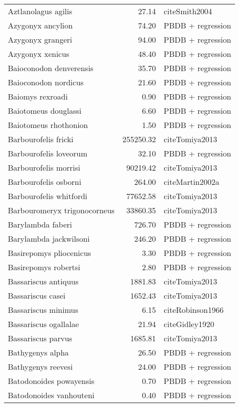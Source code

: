 \begin{table}[ht]
\begin{tabular}{lrl}
  Aztlanolagus agilis & 27.14 & cite{Smith2004} \\ 
  Azygonyx ancylion & 74.20 & PBDB + regression \\ 
  Azygonyx grangeri & 94.00 & PBDB + regression \\ 
  Azygonyx xenicus & 48.40 & PBDB + regression \\ 
  Baioconodon denverensis & 35.70 & PBDB + regression \\ 
  Baioconodon nordicus & 21.60 & PBDB + regression \\ 
  Baiomys rexroadi & 0.90 & PBDB + regression \\ 
  Baiotomeus douglassi & 6.60 & PBDB + regression \\ 
  Baiotomeus rhothonion & 1.50 & PBDB + regression \\ 
  Barbourofelis fricki & 255250.32 & cite{Tomiya2013} \\ 
  Barbourofelis loveorum & 32.10 & PBDB + regression \\ 
  Barbourofelis morrisi & 90219.42 & cite{Tomiya2013} \\ 
  Barbourofelis osborni & 264.00 & cite{Martin2002a} \\ 
  Barbourofelis whitfordi & 77652.58 & cite{Tomiya2013} \\ 
  Barbouromeryx trigonocorneus & 33860.35 & cite{Tomiya2013} \\ 
  Barylambda faberi & 726.70 & PBDB + regression \\ 
  Barylambda jackwilsoni & 246.20 & PBDB + regression \\ 
  Basirepomys pliocenicus & 3.30 & PBDB + regression \\ 
  Basirepomys robertsi & 2.80 & PBDB + regression \\ 
  Bassariscus antiquus & 1881.83 & cite{Tomiya2013} \\ 
  Bassariscus casei & 1652.43 & cite{Tomiya2013} \\ 
  Bassariscus minimus & 6.15 & cite{Robinson1966} \\ 
  Bassariscus ogallalae & 21.94 & cite{Gidley1920} \\ 
  Bassariscus parvus & 1685.81 & cite{Tomiya2013} \\ 
  Bathygenys alpha & 26.50 & PBDB + regression \\ 
  Bathygenys reevesi & 24.00 & PBDB + regression \\ 
  Batodonoides powayensis & 0.70 & PBDB + regression \\ 
  Batodonoides vanhouteni & 0.40 & PBDB + regression \\ 

\end{tabular}
\end{table}
